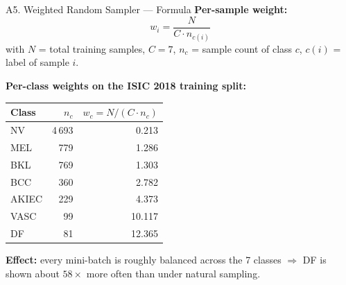 \documentclass[10pt, aspectratio=169]{beamer}
\begin{document}
\begin{frame}{A5. Weighted Random Sampler --- Formula}
    \footnotesize
    \textbf{Per-sample weight:}
    \[
        w_i = \frac{N}{C \cdot n_{c(i)}}
    \]
    with $N$ = total training samples, $C = 7$, $n_c$ = sample count of class $c$, $c(i)$ = label of sample $i$.

    \vspace{0.2cm}
    \textbf{Per-class weights on the ISIC 2018 training split:}
    \begin{table}[]
        \scriptsize \centering
        \begin{tabular}{lrr}
        \toprule
        \rowcolor{usthblue!25} \textbf{Class} & $n_c$ & $w_c = N/(C\cdot n_c)$ \\
        \midrule
        NV    & 4\,693 & 0.213 \\
        MEL   &   779  & 1.286 \\
        BKL   &   769  & 1.303 \\
        BCC   &   360  & 2.782 \\
        AKIEC &   229  & 4.373 \\
        VASC  &    99  & 10.117 \\
        DF    &    81  & 12.365 \\
        \bottomrule
        \end{tabular}
    \end{table}

    \textbf{Effect:} every mini-batch is roughly balanced across the 7 classes $\Rightarrow$ DF is shown about $58\times$ more often than under natural sampling.
\end{frame}
\end{document}
